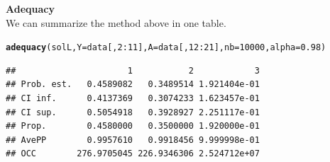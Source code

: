 \documentclass{article}\usepackage[]{graphicx}\usepackage[]{color}
\makeatletter
\newcommand{\hlnum}[1]{\textcolor[rgb]{0.686,0.059,0.569}{#1}}%
\newcommand{\hlopt}[1]{\textcolor[rgb]{0,0,0}{#1}}%
\newcommand{\hlstd}[1]{\textcolor[rgb]{0.345,0.345,0.345}{#1}}%
\newcommand{\hlkwc}[1]{\textcolor[rgb]{0.333,0.667,0.333}{#1}}%
\newcommand{\hlkwd}[1]{\textcolor[rgb]{0.737,0.353,0.396}{\textbf{#1}}}%
\newenvironment{kframe}{%
 \def\at@end@of@kframe{}%
 \ifinner\ifhmode%
  \def\at@end@of@kframe{\end{minipage}}%
  \begin{minipage}{\columnwidth}%
 \fi\fi%
 \def\FrameCommand##1{\hskip\@totalleftmargin \hskip-\fboxsep
 \colorbox{shadecolor}{##1}\hskip-\fboxsep
     \hskip-\linewidth \hskip-\@totalleftmargin \hskip\columnwidth}%
 \MakeFramed {\advance\hsize-\width
   \@totalleftmargin\z@ \linewidth\hsize
   \@setminipage}}%
 {\par\unskip\endMakeFramed%
 \at@end@of@kframe}
\newenvironment{knitrout}{}{} %
\makeatother
\begin{document}
\textbf{Adequacy}\\

We can summarize the method above in one table. 
\begin{knitrout}
\color{fgcolor}\begin{kframe}
\begin{alltt}
\hlkwd{adequacy}\hlstd{(solL,}  \hlkwc{Y} \hlstd{= data[,}\hlnum{2}\hlopt{:}\hlnum{11}\hlstd{],} \hlkwc{A} \hlstd{= data[,}\hlnum{12}\hlopt{:}\hlnum{21}\hlstd{],} \hlkwc{nb} \hlstd{=} \hlnum{10000}\hlstd{,} \hlkwc{alpha} \hlstd{=} \hlnum{0.98}\hlstd{)}
\end{alltt}
\begin{verbatim}
##                      1           2            3
## Prob. est.   0.4589082   0.3489514 1.921404e-01
## CI inf.      0.4137369   0.3074233 1.623457e-01
## CI sup.      0.5054918   0.3928927 2.251117e-01
## Prop.        0.4580000   0.3500000 1.920000e-01
## AvePP        0.9957610   0.9918456 9.999998e-01
## OCC        276.9705045 226.9346306 2.524712e+07
\end{verbatim}
\end{kframe}
\end{knitrout}
\end{document}
